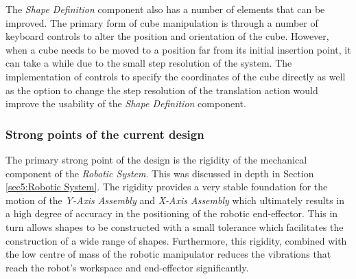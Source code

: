 The \textit{Shape Definition} component also has a number of elements that can be improved. The primary form of cube manipulation is through a number of keyboard controls to alter the position and orientation of the cube. However, when a cube needs to be moved to a position far from its initial insertion point, it can take a while due to the small step resolution of the system. The implementation of controls to specify the coordinates of the cube directly as well as the option to change the step resolution of the translation action would improve the usability of the \textit{Shape Definition} component.

%
%

\subsubsection{Strong points of the current design}


The primary strong point of the design is the rigidity of the mechanical component of the \textit{Robotic System}. This was discussed in depth in Section \ref{sec5:Robotic System}. The rigidity provides a very stable foundation for the motion of the \textit{Y-Axis Assembly} and \textit{X-Axis Assembly} which ultimately results in a high degree of accuracy in the positioning of the robotic end-effector. This in turn allows shapes to be constructed with a small tolerance which facilitates the construction of a wide range of shapes. Furthermore, this rigidity, combined with the low centre of mass of the robotic manipulator reduces the vibrations that reach the robot's workspace and end-effector significantly.


